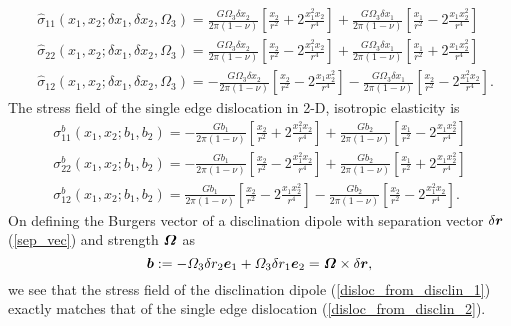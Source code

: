 \documentclass[11pt,letterpaper]{article}
\begin{document}
\begin{equation}\label{disloc_from_disclin_1}
\begin{aligned}
& \hat{\sigma}_{11}(x_1,x_2;\delta x_1,\delta x_2, \Omega_3) = \frac{G\Omega_3 \delta x_2}{2\pi(1-\nu)}\left[\frac{x_2}{r^2}+2\frac{x_1^2x_2}{r^4}\right] + \frac{G\Omega_3 \delta x_1}{2\pi(1-\nu)}\left[\frac{x_1}{r^2}-2\frac{x_1x_2^2}{r^4}\right] \\
& \hat{\sigma}_{22}(x_1,x_2;\delta x_1,\delta x_2, \Omega_3) = \frac{G\Omega_3 \delta x_2}{2\pi(1-\nu)}\left[\frac{x_2}{r^2}-2\frac{x_1^2x_2}{r^4}\right] + \frac{G\Omega_3 \delta x_1}{2\pi(1-\nu)}\left[\frac{x_1}{r^2}+2\frac{x_1x_2^2}{r^4}\right] \\
& \hat{\sigma}_{12}(x_1,x_2;\delta x_1,\delta x_2, \Omega_3) = -\frac{G\Omega_3 \delta x_2}{2\pi(1-\nu)}\left[\frac{x_2}{r^2}-2\frac{x_1x_2^2}{r^4}\right] - \frac{G\Omega_3 \delta x_1}{2\pi(1-\nu)}\left[\frac{x_2}{r^2}-2\frac{x_1^2x_2}{r^4}\right].
\end{aligned}
\end{equation}
The stress field of the single edge dislocation in 2-D, isotropic elasticity is \cite{de1973theory} 
\begin{equation}\label{disloc_from_disclin_2}
\begin{aligned}
\sigma_{11}^b(x_1,x_2;b_1, b_2) = -\frac{Gb_1}{2\pi(1-\nu)}\left[\frac{x_2}{r^2}+2\frac{x_1^2x_2}{r^4}\right] + \frac{Gb_2}{2\pi(1-\nu)}\left[\frac{x_1}{r^2}-2\frac{x_1x_2^2}{r^4}\right] \\
\sigma_{22}^b(x_1,x_2;b_1, b_2) = -\frac{Gb_1}{2\pi(1-\nu)}\left[\frac{x_2}{r^2}-2\frac{x_1^2x_2}{r^4}\right] + \frac{Gb_2}{2\pi(1-\nu)}\left[\frac{x_1}{r^2}+2\frac{x_1x_2^2}{r^4}\right] \\
\sigma_{12}^b (x_1,x_2;b_1, b_2)= \frac{Gb_1}{2\pi(1-\nu)}\left[\frac{x_2}{r^2}-2\frac{x_1x_2^2}{r^4}\right] - \frac{Gb_2}{2\pi(1-\nu)}\left[\frac{x_2}{r^2}-2\frac{x_1^2x_2}{r^4}\right].
\end{aligned}
\end{equation}
On defining the Burgers vector of a disclination dipole with separation vector $\delta \bfr$ (\ref{sep_vec})  and strength $\bfOmega$ as
\begin{equation} \label{eqn:dipole_burgers_elasticity}
\bfb :=-\Omega_3 \delta r_2 \bfe_1 + \Omega_3 \delta r_1 \bfe_2 = \bfOmega \times \delta \bfr,
\end{equation}
we see that the stress field of the disclination dipole (\ref{disloc_from_disclin_1}) exactly matches that of the single edge  dislocation (\ref{disloc_from_disclin_2}). 
\end{document}
